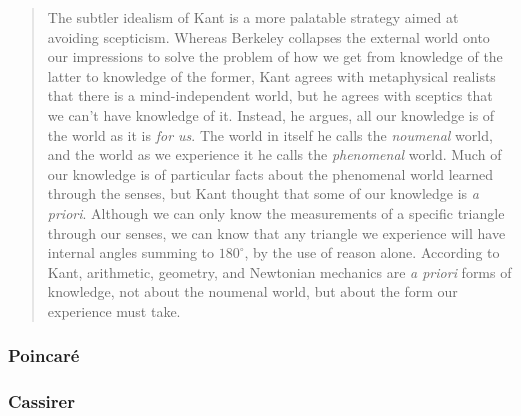 \documentclass{article}
\begin{document}
\begin{quote}
    The subtler idealism of Kant is a more palatable strategy aimed at avoiding scepticism.  Whereas Berkeley collapses the external world onto our impressions to solve the problem of how we get from knowledge of the latter to knowledge of the former, Kant agrees with metaphysical realists that there is a mind-independent world, but he agrees with sceptics that we can't have knowledge of it.  Instead, he argues, all our knowledge is of the world as it is \emph{for us}.  The world in itself he calls the \emph{noumenal} world, and the world as we experience it he calls the \emph{phenomenal} world.  Much of our knowledge is of particular facts about the phenomenal world learned through the senses, but Kant thought that some of our knowledge is \emph{a priori}.  Although we can only know the measurements of a specific triangle through our senses, we can know that any triangle we experience will have internal angles summing to $180^\circ$, by the use of reason alone.  According to Kant, arithmetic, geometry, and Newtonian mechanics are \emph{a priori} forms of knowledge, not about the noumenal world, but about the form our experience must take.  \citep[p. 146]{Ladyman2002}
\end{quote}



\subsubsection{Poincar\'e}




\subsubsection{Cassirer}
\end{document}
